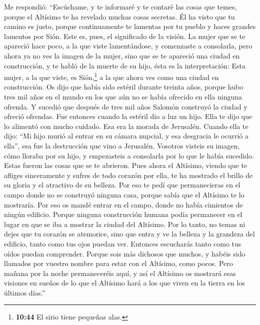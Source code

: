  Me respondió: ``Escúchame, y te informaré y te contaré
las cosas que temes, porque el Altísimo te ha revelado muchas cosas
secretas.  Él ha visto que tu camino es justo, porque
continuamente te lamentas por tu pueblo y haces grandes lamentos por
Sión.  Este es, pues, el significado de la visión.
 La mujer que se te apareció hace poco, a la que viste
lamentándose, y comenzaste a consolarla,  pero ahora ya
no ves la imagen de la mujer, sino que se te apareció una ciudad en
construcción,  y te habló de la muerte de su hijo, ésta
es la interpretación:  Esta mujer, a la que viste, es
Sión,\footnote{\textbf{10:44} El sirio tiene pequeñas alas.} a la que
ahora ves como una ciudad en construcción.  Os dijo que
había sido estéril durante treinta años, porque hubo tres mil años en el
mundo en los que aún no se había ofrecido en ella ninguna ofrenda.
 Y sucedió que después de tres mil años Salomón construyó
la ciudad y ofreció ofrendas. Fue entonces cuando la estéril dio a luz
un hijo.  Ella te dijo que lo alimentó con mucho cuidado.
Esa era la morada de Jerusalén.  Cuando ella te dijo:
``Mi hijo murió al entrar en su cámara nupcial, y esa desgracia le
ocurrió a ella'', esa fue la destrucción que vino a Jerusalén.
 Vosotros visteis su imagen, cómo lloraba por su hijo, y
empezasteis a consolarla por lo que le había sucedido. Estas fueron las
cosas que se te abrieron.  Pues ahora el Altísimo, viendo
que te afliges sinceramente y sufres de todo corazón por ella, te ha
mostrado el brillo de su gloria y el atractivo de su belleza.
 Por eso te pedí que permanecieras en el campo donde no
se construyó ninguna casa,  porque sabía que el Altísimo
te lo mostraría.  Por eso os mandé entrar en el campo,
donde no había cimientos de ningún edificio.  Porque
ninguna construcción humana podía permanecer en el lugar en que se iba a
mostrar la ciudad del Altísimo.  Por lo tanto, no temas
ni dejes que tu corazón se atemorice, sino que entra y ve la belleza y
la grandeza del edificio, tanto como tus ojos puedan ver.
 Entonces escucharás tanto como tus oídos puedan
comprender.  Porque sois más dichosos que muchos, y
habéis sido llamados por vuestro nombre para estar con el Altísimo, como
pocos.  Pero mañana por la noche permaneceréis aquí,
 y así el Altísimo os mostrará esas visiones en sueños de
lo que el Altísimo hará a los que viven en la tierra en los últimos
días.''

